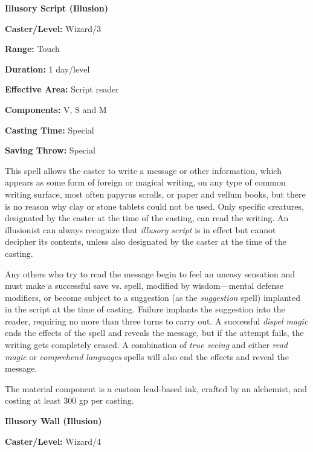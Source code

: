 \begin{multicols}{2}
\begin{minipage}{\columnwidth}
\noindent \textbf{Illusory Script (Illusion)}

\noindent \textbf{Caster/Level:} Wizard/3

\noindent \textbf{Range:} Touch

\noindent \textbf{Duration:} 1 day/level

\noindent \textbf{Effective Area:} Script reader

\noindent \textbf{Components:} V, S and M

\noindent \textbf{Casting Time:} Special

\noindent \textbf{Saving Throw:} Special

\end{minipage}

This spell allows the caster to write a message or other information, which appears as some form of foreign or magical writing, on any type of common writing surface, most often papyrus scrolls, or paper and vellum books, but there is no reason why clay or stone tablets could not be used.  Only specific creatures, designated by the caster at the time of the casting, can read the writing.  An illusionist can always recognize that \textit{illusory script} is in effect but cannot decipher its contents, unless also designated by the caster at the time of the casting.  

Any others who try to read the message begin to feel an uneasy sensation and must make a successful save vs. spell, modified by wisdom---mental defense modifiers, or become subject to a suggestion (as the \textit{suggestion} spell) implanted in the script at the time of casting.  Failure implants the suggestion into the reader, requiring no more than three turns to carry out.  A successful \textit{dispel magic} ends the effects of the spell and reveals the message, but if the attempt fails, the writing gets completely erased.  A combination of \textit{true seeing} and either \textit{read magic} or \textit{comprehend languages} spells will also end the effects and reveal the message.

The material component is a custom lead-based ink, crafted by an alchemist, and costing at least 300 gp per casting.

\vspace{1em}

\noindent
\begin{minipage}{\columnwidth}

\noindent \textbf{Illusory Wall (Illusion)}

\noindent \textbf{Caster/Level:} Wizard/4


\end{minipage}
\end{multicols}
